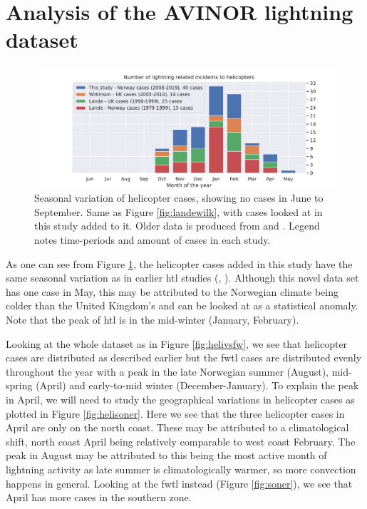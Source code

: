 \section{Analysis of the AVINOR lightning dataset}
\begin{figure}
    \centering
    \includegraphics[width=\textwidth]{Figures/yearlydistribution.pdf}
    \caption{Seasonal variation of helicopter cases, showing no cases in June to September. Same as Figure \ref{fig:landewilk}, with cases looked at in this study added to it. Older data is produced from \cite{lande1999} and \cite{wilkinson2013}. Legend notes time-periods and amount of cases in each study. }
    \label{fig:yearlyvariation}
\end{figure}

As one can see from Figure \ref{fig:yearlyvariation}, the helicopter cases added in this study have the same seasonal variation as in earlier \acrshort{htl} studies (\cite{wilkinson2013}, \cite{lande1999}). Although this novel data set has one case in May, this may be attributed to the Norwegian climate being colder than the United Kingdom's and can be looked at as a statistical anomaly. Note that the peak of \acrlong{htl} is in the mid-winter (January, February). 

Looking at the whole dataset as in Figure \ref{fig:helivsfw}, we see that helicopter cases are distributed as described earlier but the \acrshort{fwtl} cases are distributed evenly throughout the year with a peak in the late Norwegian summer (August), mid-spring (April) and early-to-mid winter (December-January). To explain the peak in April, we will need to study the geographical variations  in helicopter cases as plotted in Figure \ref{fig:helisoner}. Here we see that the three helicopter cases in April are only on the north coast. These may be attributed to a climatological shift, north coast April being relatively comparable to west coast February. The peak in August may be attributed to this being the most active month of lightning activity as late summer is climatologically warmer, so more convection happens in general. Looking at the \acrshort{fwtl} instead (Figure \ref{fig:soner}), we see that April has more cases in the southern zone.

